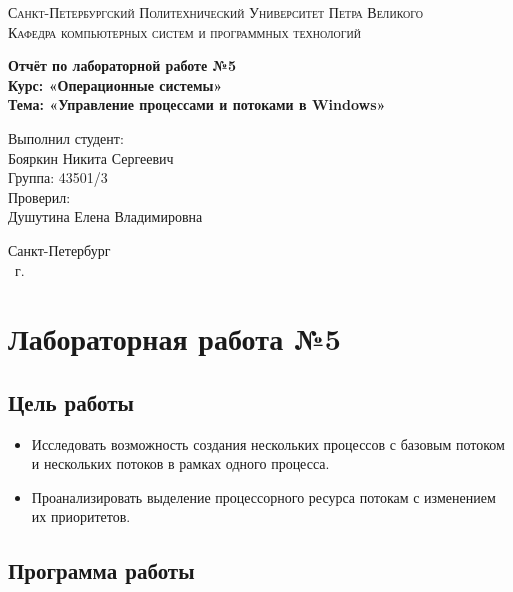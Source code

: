 \documentclass[14pt,a4paper,report]{report}
\begin{document}
\def\contentsname{Содержание}

\begin{titlepage}
	\begin{center}
		\textsc{Санкт-Петербургский Политехнический 
			Университет Петра Великого\\[5mm]
			Кафедра компьютерных систем и программных технологий}
		
		\vfill
		
		\textbf{Отчёт по лабораторной работе №5\\[3mm]
			Курс: «Операционные системы»\\[6mm]
			Тема: «Управление процессами и потоками в Windows»\\[35mm]
		}
	\end{center}
	
	\hfill
	\begin{minipage}{.5\textwidth}
		Выполнил студент:\\[2mm] 
		Бояркин Никита Сергеевич\\
		Группа: 43501/3\\[5mm]
		
		Проверил:\\[2mm] 
		Душутина Елена Владимировна
	\end{minipage}
	\vfill
	\begin{center}
		Санкт-Петербург\\ \the\year\ г.
	\end{center}
\end{titlepage}

\tableofcontents
\clearpage

\chapter{Лабораторная работа №5}

\section{Цель работы}

\begin{itemize}
	\item Исследовать возможность создания нескольких процессов с базовым потоком и нескольких потоков в рамках одного процесса.
	\item Проанализировать выделение процессорного ресурса потокам с изменением их приоритетов.
\end{itemize}

\section{Программа работы}
\end{document}
